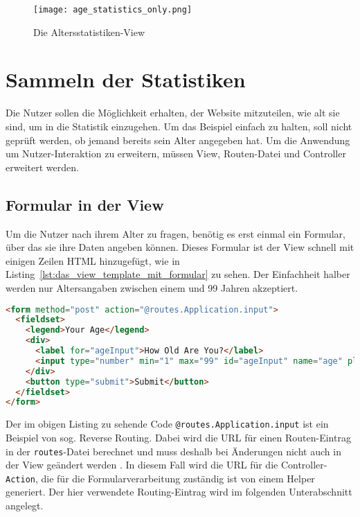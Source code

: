 \begin{figure}[t]
\centering
\texttt{[image: age\_statistics\_only.png]}
\caption{Die Altersstatistiken-View}
\label{fig:die_altersstatistiken_view}
\end{figure}




\section{Sammeln der Statistiken} %
\label{sec:sammeln_der_statistiken}

Die Nutzer sollen die Möglichkeit erhalten, der Website mitzuteilen, wie alt sie sind, um in die Statistik einzugehen.
Um das Beispiel einfach zu halten, soll nicht geprüft werden, ob jemand bereits sein Alter angegeben hat.
Um die Anwendung um Nutzer-Interaktion zu erweitern, müssen View, Routen-Datei und Controller erweitert werden.

\subsection{Formular in der View} %
\label{sub:formular_in_der_view}

Um die Nutzer nach ihrem Alter zu fragen, benötig es erst einmal ein Formular, über das sie ihre Daten angeben können.
Dieses Formular ist der View schnell mit einigen Zeilen HTML hinzugefügt, wie in Listing~\ref{lst:das_view_template_mit_formular} zu sehen.
Der Einfachheit halber werden nur Altersangaben zwischen einem und 99 Jahren akzeptiert.

\begin{lstlisting}[language=html, caption=Das View-Template mit Formular, label=lst:das_view_template_mit_formular]
<form method="post" action="@routes.Application.input">
  <fieldset>
    <legend>Your Age</legend>
    <div>
      <label for="ageInput">How Old Are You?</label>
      <input type="number" min="1" max="99" id="ageInput" name="age" placeholder="Enter Age">
    </div>
    <button type="submit">Submit</button>
  </fieldset>
</form>
\end{lstlisting}

Der im obigen Listing zu sehende Code \lstinline|@routes.Application.input| ist ein Beispiel von sog. Reverse Routing.
Dabei wird die URL für einen Routen-Eintrag in der \lstinline|routes|-Datei berechnet und muss deshalb bei Änderungen nicht auch in der View geändert werden \cite[vgl.][S.~98--100]{play_for_scala}.
In diesem Fall wird die URL für die Controller-\lstinline|Action|, die für die Formularverarbeitung zuständig ist von einem Helper generiert.
Der hier verwendete Routing-Eintrag wird im folgenden Unterabschnitt angelegt.

